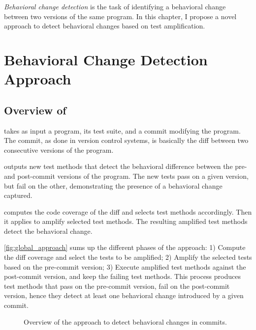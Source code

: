 \emph{Behavioral change detection} is the task of identifying a behavioral change between two versions of the same program.
In this chapter, I propose a novel approach to detect behavioral changes based on test amplification.


\section{Behavioral Change Detection Approach}
\label{sec:dci:techniques}

\subsection{Overview of \DCI}
\label{sec:dci:techniques:overview}

\DCI takes as input a program, its test suite, and a commit modifying the program.
The commit, as done in version control systems, is basically the diff between two consecutive versions of the program.

\DCI outputs new test methods that detect the behavioral difference between the pre- and post-commit versions of the program.
The new tests pass on a given version, but fail on the other, demonstrating the presence of a behavioral change captured.

\DCI computes the code coverage of the diff and selects test methods accordingly.
Then it applies \dspot to amplify selected test methods.
The resulting amplified test methods detect the behavioral change.

\autoref{fig:global_approach} sums up the different phases of the approach:
1) Compute the diff coverage and select the tests to be amplified;
2) Amplify the selected tests based on the pre-commit version;
3) Execute amplified test methods against the post-commit version, and keep the failing test methods.
This process produces test methods that pass on the pre-commit version, fail on the post-commit version, hence they detect at least one behavioral change introduced by a given commit.

\begin{figure}
    \caption{Overview of the approach to detect behavioral changes in commits.}
    \label{fig:global_approach}
\end{figure}

